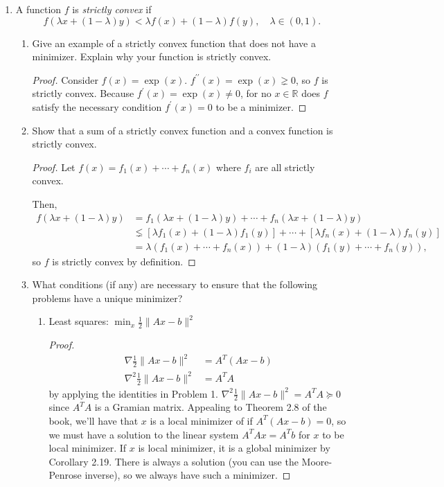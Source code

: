 \documentclass[11pt]{amsart}
\begin{document}
\begin{enumerate}
\bigskip\bigskip


\item A function $f$ is {\it strictly convex} if 
\[
f(\lambda x + (1-\lambda)y) < \lambda f(x) + (1-\lambda) f(y), \quad \lambda \in (0,1).
\]
\begin{enumerate}
\item Give an example of a strictly convex function that 
  does not have a minimizer. Explain why your function is strictly convex.
  \begin{proof}
    Consider $f(x) = \exp(x)$. $f^{\prime\prime}(x) = \exp(x) \gneq 0$, so $f$
    is strictly convex. Because $f^\prime(x) = \exp(x) \neq 0$, for no
    $x \in \mathbb{R}$ does $f$ satisfy the necessary condition
    $f^\prime(x) = 0$ to be a minimizer.
  \end{proof}
\item Show that a sum of a strictly convex function and a convex function is strictly convex.
  \begin{proof}
    Let $f(x) = f_1(x) + \cdots + f_n(x)$ where $f_i$ are all strictly convex.
    
    Then,
    \begin{align*}
      f(\lambda x + (1-\lambda)y)
      &= f_1(\lambda x + (1-\lambda)y) + \cdots + f_n(\lambda x + (1-\lambda)y) \\
      &\lneq \left[\lambda f_1(x) + (1-\lambda)f_1(y)\right] + \cdots + \left[\lambda f_n(x) + (1-\lambda)f_n(y)\right] \\
      &= \lambda\left(f_1(x) + \cdots + f_n(x)\right) + \left(1 - \lambda\right)\left(f_1(y) + \cdots + f_n(y)\right),
    \end{align*}
    so $f$ is strictly convex by definition.
  \end{proof}
\item What conditions (if any) are necessary to ensure that the following problems have a unique minimizer?  
\begin{enumerate}
\item Least squares: $\min_x \frac{1}{2}\|Ax - b\|^2$
  \begin{proof}    
    \begin{align*}
      \nabla \frac{1}{2}\|Ax - b\|^2
      &= A^T\left(Ax - b\right) \\
      \nabla^2 \frac{1}{2}\|Ax - b\|^2
      &= A^TA
    \end{align*}
    by applying the identities in Problem 1.
    $\nabla^2 \frac{1}{2}\|Ax - b\|^2 = A^TA \succeq 0$ since $A^TA$ is a
    Gramian matrix. Appealing to Theorem 2.8 of the book, we'll have that $x$ is
    a local minimizer of if $A^T\left(Ax - b\right) = 0$, so we must have a
    solution to the linear system $A^TAx = A^Tb$ for $x$ to be local
    minimizer. If $x$ is local minimizer, it is a global minimizer by Corollary
    2.19. There is always a solution (you can use the Moore-Penrose inverse), so
    we always have such a minimizer.


\end{proof}
\end{enumerate}
\end{enumerate}
\end{enumerate}
\end{document}
